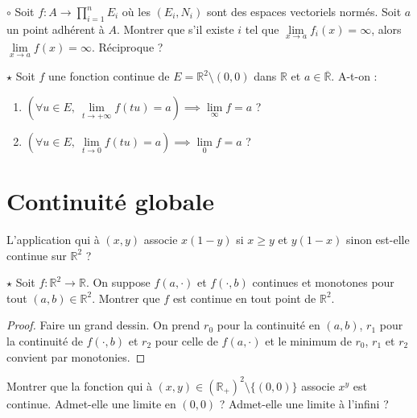\documentclass[french,a4paper]{article}
\newcommand{\R}{\mathbb{R}}
\theoremstyle{plain}
\theoremstyle{definition}
\theoremstyle{remark}
\begin{document}
\begin{ex}[Moulin.09]{$\circ$}
	Soit $f:A\to\displaystyle\prod_{i=1}^{n}E_i$ où les $(E_i,N_i)$ sont des espaces vectoriels normés. Soit $a$ un point adhérent à $A$. Montrer que s'il existe $i$ tel que $\underset{x\to a}{\lim} f_i(x)=\infty$, alors $\underset{x\to a}{\lim} f(x)=\infty$. Réciproque ?
\end{ex}

\begin{ex}[Moulin.10]{$\star$}
	Soit $f$ une fonction continue de $E=\R^2\setminus{(0,0)}$ dans $\R$ et $a\in\overline{\R}$. A-t-on :
	\begin{enumerate}
		\item $\left(\forall u\in E,\ \underset{t\to+\infty}{\lim}f(tu)=a\right)\implies \underset{\infty}{\lim} f=a$ ?
		\item $\left(\forall u\in E,\ \underset{t\to0}{\lim}f(tu)=a\right)\implies \underset{0}{\lim} f=a$ ?
	\end{enumerate}
\end{ex}

\section{Continuité globale}

\begin{ex}[Moulin.11]{}
	L'application qui à $(x,y)$ associe $x(1-y)$ si $x\geqslant y$ et $y(1-x)$ sinon est-elle continue sur $\R^2$ ?
\end{ex}

\begin{ex}[Moulin.12]{$\star$}
	Soit $f:\R^2\to\R$. On suppose $f(a,\cdot)$ et $f(\cdot,b)$ continues et monotones pour tout $(a,b)\in\R^2$. Montrer que $f$ est continue en tout point de $\R^2$.
\end{ex}
\begin{proof}
	Faire un grand dessin. On prend $r_0$ pour la continuité en $(a,b)$, $r_1$ pour la continuité de $f(\cdot,b)$ et $r_2$ pour celle de $f(a,\cdot)$ et le minimum de $r_0$, $r_1$ et $r_2$ convient par monotonies.
\end{proof}

\begin{ex}[Moulin.13]{}
	Montrer que la fonction qui à $(x,y)\in(\R_+)^2\setminus\{(0,0)\}$ associe $x^y$ est continue. Admet-elle une limite en $(0,0)$ ? Admet-elle une limite à l'infini ?
\end{ex}
\end{document}
